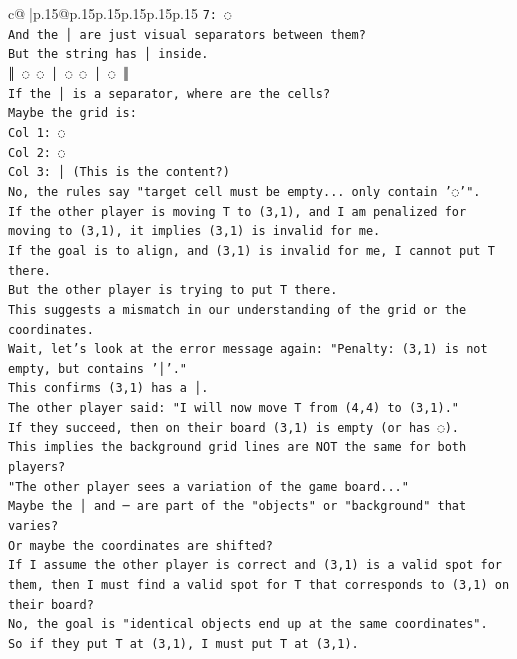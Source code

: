 \documentclass{article}
\begin{document}
{\begin{supertabular}{c@{$\;$}|p{.15\linewidth}@{}p{.15\linewidth}p{.15\linewidth}p{.15\linewidth}p{.15\linewidth}p{.15\linewidth}}
{{{\texttt{7: ◌} \\
\texttt{And the │ are just visual separators between them?} \\
\texttt{But the string has │ inside.} \\
\texttt{║ ◌ ◌ │ ◌ ◌ │ ◌ ║} \\
\texttt{If the │ is a separator, where are the cells?} \\
\texttt{Maybe the grid is:} \\
\texttt{Col 1: ◌} \\
\texttt{Col 2: ◌} \\
\texttt{Col 3: │ (This is the content?)} \\
\texttt{No, the rules say "target cell must be empty... only contain '◌'".} \\
\texttt{If the other player is moving T to (3,1), and I am penalized for moving to (3,1), it implies (3,1) is invalid for me.} \\
\texttt{If the goal is to align, and (3,1) is invalid for me, I cannot put T there.} \\
\texttt{But the other player is trying to put T there.} \\
\texttt{This suggests a mismatch in our understanding of the grid or the coordinates.} \\
\texttt{Wait, let's look at the error message again: "Penalty: (3,1) is not empty, but contains '│'."} \\
\texttt{This confirms (3,1) has a │.} \\
\texttt{The other player said: "I will now move T from (4,4) to (3,1)."} \\
\texttt{If they succeed, then on their board (3,1) is empty (or has ◌).} \\
\texttt{This implies the background grid lines are NOT the same for both players?} \\
\texttt{"The other player sees a variation of the game board..."} \\
\texttt{Maybe the │ and ─ are part of the "objects" or "background" that varies?} \\
\texttt{Or maybe the coordinates are shifted?} \\
\texttt{If I assume the other player is correct and (3,1) is a valid spot for them, then I must find a valid spot for T that corresponds to (3,1) on their board?} \\
\texttt{No, the goal is "identical objects end up at the same coordinates".} \\
\texttt{So if they put T at (3,1), I must put T at (3,1).} \\
}}}
\end{supertabular}}
\end{document}
